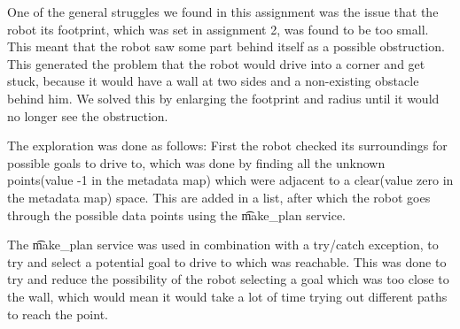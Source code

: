 


One of the general struggles we found in this assignment was the issue that the robot its footprint, which was set in assignment 2, was found to be too small. This meant that the robot saw some part behind itself as a possible obstruction. This generated the problem that the robot would drive into a corner and get stuck, because it would have a wall at two sides and a non-existing obstacle behind him. We solved this by enlarging the footprint and radius until it would no longer see the obstruction.

The exploration was done as follows: First the robot checked its surroundings for possible goals to drive to, which was done by finding all the unknown points(value -1 in the metadata map) which were adjacent to a clear(value zero in the metadata map) space. This are added in a list, after which the robot goes through the possible data points using the \t{make_plan} service.

The \t{make_plan} service was used in combination with a try/catch exception, to try and select a potential goal to drive to which was reachable. This was done to try and reduce the possibility of the robot selecting a goal which was too close to the wall, which would mean it would take a lot of time trying out different paths to reach the point.

